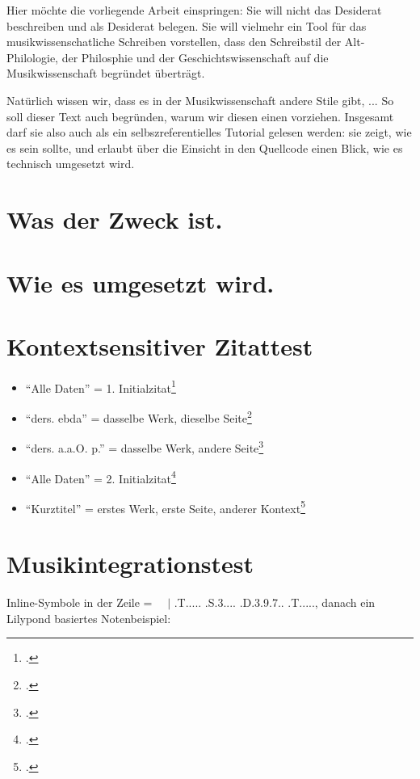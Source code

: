 \documentclass[
  DIV=calc,
  BCOR=5mm,
  11pt,
  headings=small,
  oneside,
  abstract=true,
  toc=bib,
  english,ngerman]{scrartcl}
\begin{document}
Hier möchte die vorliegende Arbeit einspringen: Sie will nicht das Desiderat beschreiben und als Desiderat belegen. Sie will vielmehr ein Tool für das musikwissenschatliche Schreiben vorstellen, dass den Schreibstil der Alt-Philologie, der Philosphie und der Geschichtswissenschaft auf die Musikwissenschaft begründet überträgt.

Natürlich wissen wir, dass es in der Musikwissenschaft andere Stile gibt, ... So soll dieser Text auch begründen, warum wir diesen einen vorziehen. Insgesamt darf sie also auch als ein selbszreferentielles Tutorial gelesen werden: sie zeigt, wie es sein sollte, und erlaubt über die Einsicht in den Quellcode einen Blick, wie es technisch umgesetzt wird.

\section{Was der Zweck ist.}

\section{Wie es umgesetzt wird.}


\section{Kontextsensitiver Zitattest}

\begin{itemize}
  \item \enquote{Alle Daten} = 1. Initialzitat\footcite[vgl.][123]{Grabner1974a}
  \item \enquote{ders. ebda} = dasselbe Werk, dieselbe Seite\footcite[vgl.][123]{Grabner1974a}
  \item \enquote{ders. a.a.O. p.} = dasselbe Werk, andere Seite\footcite[vgl.][125f]{Grabner1974a}
  \item \enquote{Alle Daten} = 2. Initialzitat\footcite[vgl.][123]{Delamotte2011a}
  \item \enquote{Kurztitel} = erstes Werk, erste Seite, anderer  Kontext\footcite[vgl.][123]{Grabner1974a}
\end{itemize}

\section{Musikintegrationstest}

Inline-Symbole in der Zeile =  \SePa \Vier\SechBL\SechBL\ \Halb\Pu\ $|$ \HH.T..... \HH.S.3.... \HH.D.3.9.7.. \HH.T....., danach ein Lilypond basiertes Notenbeispiel:
\end{document}
